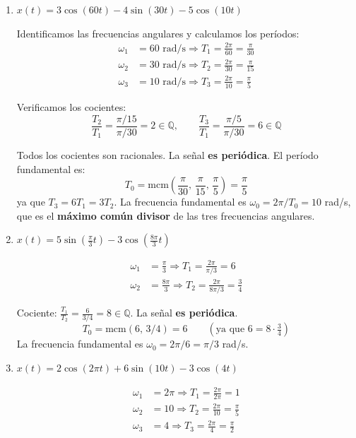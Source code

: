 \documentclass[10pt,a4paper]{article}
\begin{document}
	\begin{enumerate}[label=\textbf{\alph*)}]
		\item $x(t) = 3\cos(60t) - 4\sin(30t) - 5\cos(10t)$
		
		Identificamos las frecuencias angulares y calculamos los períodos:
		\begin{align*}
		\omega_1 &= 60 \text{ rad/s} \Rightarrow T_1 = \frac{2\pi}{60} = \frac{\pi}{30} \\
		\omega_2 &= 30 \text{ rad/s} \Rightarrow T_2 = \frac{2\pi}{30} = \frac{\pi}{15} \\
		\omega_3 &= 10 \text{ rad/s} \Rightarrow T_3 = \frac{2\pi}{10} = \frac{\pi}{5}
		\end{align*}
		
		Verificamos los cocientes:
		\[
		\frac{T_2}{T_1} = \frac{\pi/15}{\pi/30} = 2 \in \mathbb{Q}, \qquad \frac{T_3}{T_1} = \frac{\pi/5}{\pi/30} = 6 \in \mathbb{Q}
		\]
		
		Todos los cocientes son racionales. La señal \textbf{es periódica}. El período fundamental es:
		\[
		T_0 = \text{mcm}\!\left(\frac{\pi}{30},\, \frac{\pi}{15},\, \frac{\pi}{5}\right) = \frac{\pi}{5}
		\]
		ya que $T_3 = 6T_1 = 3T_2$. La frecuencia fundamental es $\omega_0 = 2\pi/T_0 = 10$ rad/s, que es el \textbf{máximo común divisor} de las tres frecuencias angulares.
		
		\item $x(t) = 5\sin\!\left(\frac{\pi}{3}t\right) - 3\cos\!\left(\frac{8\pi}{3}t\right)$
		
		\begin{align*}
		\omega_1 &= \frac{\pi}{3} \Rightarrow T_1 = \frac{2\pi}{\pi/3} = 6 \\
		\omega_2 &= \frac{8\pi}{3} \Rightarrow T_2 = \frac{2\pi}{8\pi/3} = \frac{3}{4}
		\end{align*}
		
		Cociente: $\frac{T_1}{T_2} = \frac{6}{3/4} = 8 \in \mathbb{Q}$. La señal \textbf{es periódica}.
		\[
		T_0 = \text{mcm}(6,\, 3/4) = 6 \qquad (\text{ya que } 6 = 8\cdot\tfrac{3}{4})
		\]
		La frecuencia fundamental es $\omega_0 = 2\pi/6 = \pi/3$ rad/s.
		
		\item $x(t) = 2\cos(2\pi t) + 6\sin(10t) - 3\cos(4t)$
		
		\begin{align*}
		\omega_1 &= 2\pi \Rightarrow T_1 = \frac{2\pi}{2\pi} = 1 \\
		\omega_2 &= 10 \Rightarrow T_2 = \frac{2\pi}{10} = \frac{\pi}{5} \\
		\omega_3 &= 4 \Rightarrow T_3 = \frac{2\pi}{4} = \frac{\pi}{2}
		\end{align*}
		

\end{enumerate}
\end{document}
